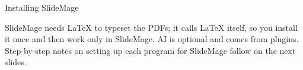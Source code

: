 

\begin{sectionframe}{Installing SlideMage}
	\begin{minipage}[t]{0.9\linewidth}\small
		SlideMage needs LaTeX to typeset the PDFs; it calls LaTeX itself, so you install it once and then work only in SlideMage. AI is optional and comes from plugins. Step-by-step notes on setting up each program for SlideMage follow on the next slides.
	\end{minipage}\par\medskip
	\SMChapterAgenda
\end{sectionframe}
